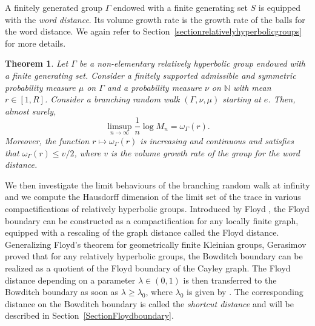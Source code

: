 \documentclass{amsart}
\newtheorem{thm}{Theorem}[section]
\theoremstyle{definition}
\theoremstyle{remark}
\begin{document}
A finitely generated group $\Gamma$ endowed with a finite generating set $S$ is equipped with the \textit{word distance}.
Its volume growth rate is the growth rate of the balls for the word distance.
We again refer to Section~\ref{sectionrelativelyhyperbolicgroups} for more details.

\begin{thm}\label{Thmvolumegrowthconst}
Let $\Gamma$ be a non-elementary relatively hyperbolic group endowed with a finite generating set.
Consider a finitely supported admissible and symmetric probability measure $\mu$ on $\Gamma$ and a probability measure $\nu$ on $\mathbb{N}$ with mean $r\in [1,R]$.
Consider a branching random walk $(\Gamma,\nu,\mu)$ starting at $e$.
Then, almost surely,
$$\limsup_{n\to\infty}\frac{1}{n}\log M_n=\omega_\Gamma(r).$$
Moreover, the function $r\mapsto \omega_\Gamma(r)$ is increasing and continuous and satisfies that $\omega_\Gamma(r)\leq v/2$, where $v$ is the volume growth rate of the group for the word distance.
\end{thm}

We then investigate the limit behaviours of the branching random walk at infinity and we compute the Hausdorff dimension of the limit set of the trace in various compactifications of relatively hyperbolic groups. Introduced by Floyd \cite{Floyd}, the Floyd boundary can be constructed as a compactification for  any locally finite graph, equipped with a rescaling of the graph distance called the Floyd distance. 
Generalizing Floyd's theorem  \cite{Floyd} for geometrically finite Kleinian groups,   Gerasimov \cite{Gerasimov} proved that for any relatively hyperbolic groups, the Bowditch boundary can be realized as a quotient of  the Floyd boundary of the Cayley graph.  The Floyd distance depending on a parameter $\lambda\in (0,1)$ is then transferred to the Bowditch boundary  as soon as $\lambda\geq \lambda_0$, where $\lambda_0$ is given by \cite[Map Theorem]{Gerasimov}.
The corresponding distance on the Bowditch boundary is called the \textit{shortcut distance} and will be described in Section~\ref{SectionFloydboundary}. %
\end{document}
